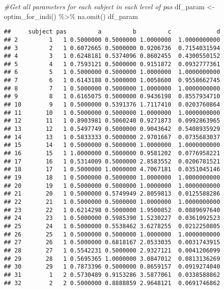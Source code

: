 \documentclass[
]{article}
\newenvironment{Shaded}{\begin{snugshade}}{\end{snugshade}}
\newcommand{\CommentTok}[1]{\textcolor[rgb]{0.56,0.35,0.01}{\textit{#1}}}
\newcommand{\FunctionTok}[1]{\textcolor[rgb]{0.00,0.00,0.00}{#1}}
\newcommand{\NormalTok}[1]{#1}
\newcommand{\OtherTok}[1]{\textcolor[rgb]{0.56,0.35,0.01}{#1}}
\newcommand{\SpecialCharTok}[1]{\textcolor[rgb]{0.00,0.00,0.00}{#1}}
\begin{document}
\begin{Shaded}
\begin{Highlighting}[]
\CommentTok{\#Get all parameters for each subject in each level of pas}
\NormalTok{df\_param }\OtherTok{\textless{}{-}} \FunctionTok{optim\_for\_indi}\NormalTok{() }\SpecialCharTok{\%\textgreater{}\%} 
  \FunctionTok{na.omit}\NormalTok{()}
\NormalTok{df\_param}
\end{Highlighting}
\end{Shaded}

\begin{verbatim}
##     subject pas         a         b         c             d
## 2         1   1 0.5000000 0.5000000 1.0000000  1.0000000000
## 3         2   1 0.6072665 0.5000000 0.9206736  0.7154031594
## 4         3   1 0.6248181 0.5374096 0.8602455  0.4300550152
## 5         4   1 0.7593121 0.5000000 0.9151872  0.0932777361
## 6         5   1 0.5000000 0.5000000 1.0000000  1.0000000000
## 7         6   1 0.6143188 0.5000000 1.0058600  0.9558662745
## 8         7   1 0.5000000 0.5000000 1.0000000  1.0000000000
## 9         8   1 0.6165075 0.5000000 0.9436198  0.8557934710
## 10        9   1 0.5000000 0.5391376 1.7117410  0.0203760864
## 11       10   1 0.5000000 0.5000000 1.0000000  1.0000000000
## 12       11   1 0.8903981 0.5060240 0.9271873  0.0992863965
## 13       12   1 0.5497749 0.5000000 0.9043642  0.5408935929
## 14       13   1 0.5833333 0.5000000 2.9701667  0.0735683037
## 15       14   1 0.5000000 0.5000000 1.0000000  1.0000000000
## 16       15   1 1.0000000 0.5000000 0.9581202  0.0776958221
## 17       16   1 0.5314009 0.5000000 2.8583552  0.0206781521
## 18       17   1 0.5000000 1.0000000 4.7067181  0.0351045146
## 19       18   1 0.5000000 0.5000000 1.0000000  1.0000000000
## 20       19   1 0.5000000 0.5000000 1.0000000  1.0000000000
## 21       20   1 0.5000000 0.5749949 2.8059813  0.0125588286
## 22       21   1 0.5000000 0.5000000 1.0000000  1.0000000000
## 23       22   1 0.6214298 0.5000000 1.9500852  0.0889697640
## 24       23   1 0.5000000 0.5985390 1.5230227  0.0361092523
## 25       24   1 0.5000000 0.5538462 3.6278255  0.0212250805
## 26       25   1 0.5000000 0.5000000 1.0000000  1.0000000000
## 27       26   1 0.5000000 0.6818167 2.0533035  0.0031743915
## 28       27   1 0.5542231 0.5000000 2.9327121  0.0041206099
## 29       28   1 0.5695365 1.0000000 3.0847012  0.0813136269
## 30       29   1 0.7873396 0.5000000 0.8659157  0.0919274040
## 31        1   2 0.5730489 0.9153286 3.5877061  0.0338588862
## 32        2   2 0.5000000 0.8888859 2.9648121  0.0691746862

\end{verbatim}
\end{document}
